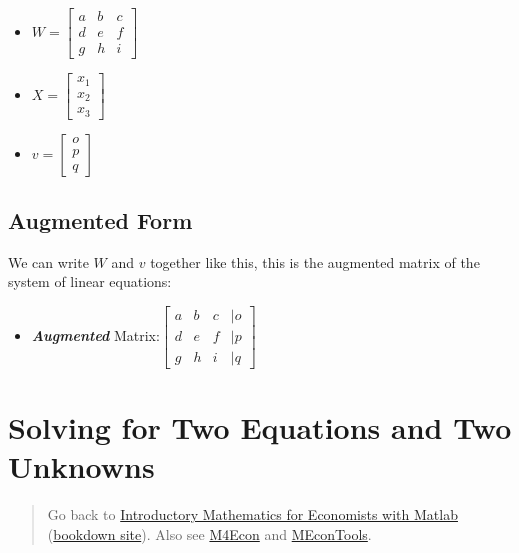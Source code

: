 \documentclass[
]{book}
\providecommand{\tightlist}{%
  \setlength{\itemsep}{0pt}\setlength{\parskip}{0pt}}
\begin{document}
\begin{itemize}
\item
  \(\displaystyle W=\left\lbrack \begin{array}{ccc} a & b & c\\ d & e & f\\ g & h & i \end{array}\right\rbrack\)
\item
  \(\displaystyle X=\left\lbrack \begin{array}{c} x_1 \\ x_2 \\ x_3 \end{array}\right\rbrack\)
\item
  \(\displaystyle v=\left\lbrack \begin{array}{c} o\\ p\\ q \end{array}\right\rbrack\)
\end{itemize}

\hypertarget{augmented-form}{%
\subsection{Augmented Form}\label{augmented-form}}

We can write \(W\) and \(v\) together like this, this is the augmented
matrix of the system of linear equations:

\begin{itemize}
\tightlist
\item
  \textbf{\emph{Augmented}} Matrix:\(\left\lbrack \begin{array}{cccc} a & b & c & |o\\ d & e & f & |p\\ g & h & i & |q \end{array}\right\rbrack\)
\end{itemize}

\vspace{1em}

\hypertarget{solving-for-two-equations-and-two-unknowns}{%
\section{Solving for Two Equations and Two Unknowns}\label{solving-for-two-equations-and-two-unknowns}}

\begin{quote}
Go back to \href{https://math4econ.github.io/}{Introductory Mathematics for Economists with Matlab} (\href{https://math4econ.github.io/bookdown}{bookdown site}). Also see \href{http://fanwangecon.github.io/M4Econ}{M4Econ} and \href{https://fanwangecon.github.io/MEconTools/}{MEconTools}.
\end{quote}
\end{document}

